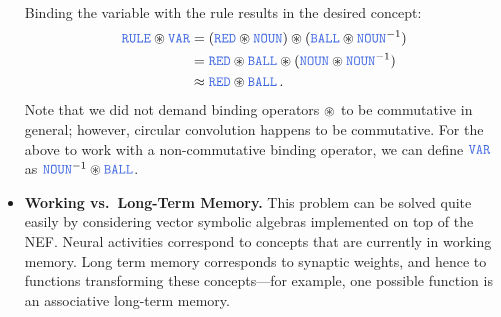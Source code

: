 \documentclass[10pt,letterpaper,oneside]{article}
\begin{document}
\begin{itemize}
\begin{align*}
	\end{align*}
	Binding the variable with the rule results in the desired concept:
	\begin{align*}
		\Obj{RULE} \CC \Obj{VAR} &= ( \Obj{RED} \CC \Obj{NOUN} ) \CC ( \Obj{BALL} \CC \Obj{NOUN}^{-1} ) \\
		                         &= \Obj{RED} \CC \Obj{BALL} \CC ( \Obj{NOUN} \CC \Obj{NOUN}^{-1} ) \\
		                         &\approx \Obj{RED} \CC \Obj{BALL} \,.
	\end{align*}
	Note that we did not demand binding operators $\circledast$ to be commutative in general; however, circular convolution happens to be commutative. For the above to work with a non-commutative binding operator, we can define $\Obj{VAR}$ as $\Obj{NOUN}^{-1} \CC \Obj{BALL}$.
	\item \textbf{Working vs.~Long-Term Memory.} This problem can be solved quite easily by considering vector symbolic algebras implemented on top of the NEF. Neural activities correspond to concepts that are currently in working memory. Long term memory corresponds to synaptic weights, and hence to functions transforming these concepts---for example, one possible function is an associative long-term memory.
\end{itemize}

\printbibliography
\end{document}
